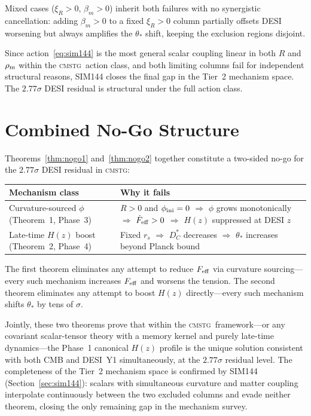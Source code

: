 \documentclass[12pt,a4paper]{article}
\newcommand{\CMSTG}{\textsc{cmstg}}
\newcommand{\Feff}{F_{\rm eff}}
\newcommand{\thetastar}{\theta_*}
\newcommand{\rs}{r_s}
\newcommand{\DC}{D_C^*}
\theoremstyle{plain}
\begin{document}
Mixed cases ($\xi_R>0$, $\beta_m>0$) inherit both failures with no synergistic cancellation:
adding $\beta_m>0$ to a fixed $\xi_R>0$ column partially offsets DESI worsening but
always amplifies the $\thetastar$ shift, keeping the exclusion regions disjoint.

Since action~\eqref{eq:sim144} is the most general scalar coupling linear in both
$R$ and $\rho_{\rm m}$ within the \CMSTG\ action class, and both limiting columns fail
for independent structural reasons, SIM144 closes the final gap in the Tier~2
mechanism space. The $2.77\sigma$ DESI residual is structural under the full action class.

\section{Combined No-Go Structure}
\label{sec:combined}

Theorems~\ref{thm:nogo1} and~\ref{thm:nogo2} together constitute a two-sided
no-go for the $2.77\sigma$ DESI residual in \CMSTG:

\begin{center}
\renewcommand{\arraystretch}{1.4}
\begin{tabular}{p{6.2cm}p{7.3cm}}
\toprule
\textbf{Mechanism class} & \textbf{Why it fails} \\
\midrule
Curvature-sourced $\phi$ \newline (Theorem~1, Phase~3) &
  $R>0$ and $\phi_{\rm ini}=0$ $\Rightarrow$ $\phi$ grows monotonically
  $\Rightarrow$ $\dot\Feff>0$ $\Rightarrow$ $H(z)$ suppressed at DESI $z$ \\
Late-time $H(z)$ boost \newline (Theorem~2, Phase~4) &
  Fixed $\rs$ $\Rightarrow$ $\DC$ decreases $\Rightarrow$ $\thetastar$
  increases beyond Planck bound \\
\bottomrule
\end{tabular}
\end{center}

\medskip
The first theorem eliminates any attempt to reduce $\Feff$ via curvature
sourcing---every such mechanism increases $\Feff$ and worsens the tension.
The second theorem eliminates any attempt to boost $H(z)$ directly---every
such mechanism shifts $\thetastar$ by tens of $\sigma$.

Jointly, these two theorems prove that within the \CMSTG\ framework---or any
covariant scalar-tensor theory with a memory kernel and purely late-time
dynamics---the Phase~1 canonical $H(z)$ profile is the unique solution
consistent with both CMB and DESI~Y1 simultaneously, at the $2.77\sigma$
residual level. The completeness of the Tier~2 mechanism space is confirmed
by SIM144 (Section~\ref{sec:sim144}): scalars with simultaneous curvature
and matter coupling interpolate continuously between the two excluded columns
and evade neither theorem, closing the only remaining gap in the mechanism survey.
\end{document}
